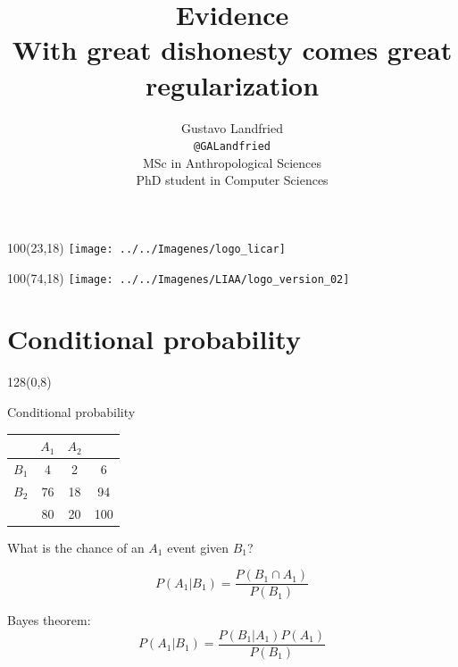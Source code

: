 \documentclass[shownotes]{beamer}
\title[Evidence]{Evidence \\ \large With great dishonesty comes great regularization}
\author[Gustavo Landfried]{Gustavo Landfried \\ \scriptsize \texttt{@GALandfried} \\\vspace{0.2cm}
MSc in Anthropological Sciences \\
PhD student in Computer Sciences 
\vspace{-0.3cm}}
\institute[DC-ICC-CONICET]{\texttt{[image: ../../Imagenes/dc-logo]}}
\date{}
\begin{document}
\begin{frame}[noframenumbering]
 
 \begin{textblock}{100}(23,18)
 \texttt{[image: ../../Imagenes/logo\_licar]} 
 \end{textblock}
  \begin{textblock}{100}(74,18)
 \texttt{[image: ../../Imagenes/LIAA/logo\_version\_02]} 
 \end{textblock}

\vspace{2.5cm}
\maketitle
 
\end{frame}

\footnotesize

\section{Conditional probability}


\begin{frame}
\begin{textblock}{128}(0,8)
\begin{center}
 \Large Conditional probability
\end{center}
\end{textblock}
\vspace{0.75cm}


\begin{table}[H]
\begin{tabular}{c|c|c|c}
 & $A_1$ & $A_2$ &  \\ \hline
 $B_1$& 4 & 2 & 6 \\ \hline
 $B_2$& 76 & 18 & 94\\ \hline
 & 80 & 20 & 100
\end{tabular}
\end{table}

\begin{center}
What is the chance of an $A_1$ event given $B_1$? 
\end{center}

\pause

\begin{equation*}
 P(A_1|B_1) = \frac{P(B_1 \cap A_1)}{P(B_1)}
\end{equation*}

\pause 

\begin{mdframed}
Bayes theorem:
\begin{equation}
  P(A_1|B_1) = \frac{P(B_1|A_1)P(A_1)}{P(B_1)}
\end{equation}
\end{mdframed}

\end{frame}
\end{document}

